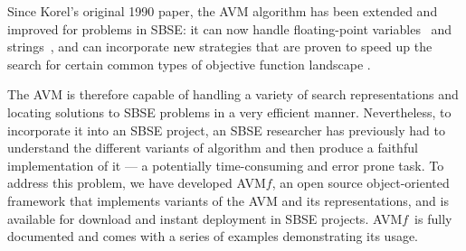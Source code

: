\documentclass{llncs}
\newcommand{\name}{AVM\hspace{-1pt}$f$\xspace}
\begin{document}
Since Korel's original 1990 paper, the AVM algorithm has been extended and improved for problems in SBSE: it can now handle floating-point variables~\cite{Harman2007} and strings~\cite{McMinn2015}, and can incorporate new strategies that are proven to speed up the search for certain common types of objective function landscape
\cite{%
Kempka2015}.

The AVM is therefore capable of handling a variety of search representations and locating solutions to SBSE problems in a very efficient manner. Nevertheless, to incorporate it into an SBSE project, an SBSE researcher has previously had to understand the different variants of algorithm and then produce a faithful implementation of it --- a potentially time-consuming and error prone task. To address this problem, we have developed \name, an open source object-oriented framework that implements variants of the AVM and its representations, and is available for download and instant deployment in SBSE projects. \name~is fully documented and comes with a series of examples demonstrating its usage.


\end{document}
